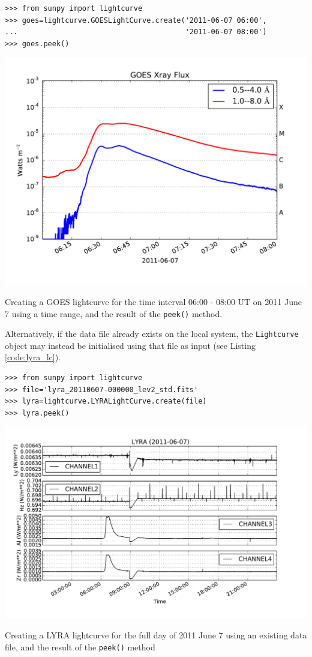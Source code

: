 \begin{listing}[H]
\begin{verbatim}
>>> from sunpy import lightcurve
>>> goes=lightcurve.GOESLightCurve.create('2011-06-07 06:00',
...                                       '2011-06-07 08:00')
>>> goes.peek()
\end{verbatim}
\includegraphics[width=14cm]{goes_lightcurve.pdf}
\caption{Creating a GOES lightcurve for the time interval 06:00 - 08:00 UT on 
2011 June 7 using a time range, and the result of the \texttt{peek()} method.}
\label{code:goes_lc}
\end{listing}

Alternatively, if the data file already exists on the local system, the 
\texttt{Lightcurve} object may instead be initialised using that file as input 
(see Listing \ref{code:lyra_lc}).

\begin{listing}[H]
\begin{verbatim}
>>> from sunpy import lightcurve
>>> file='lyra_20110607-000000_lev2_std.fits'
>>> lyra=lightcurve.LYRALightCurve.create(file)
>>> lyra.peek()
\end{verbatim}
\includegraphics[width=14cm]{lyra_lightcurve.pdf}
\caption{Creating a LYRA lightcurve for the full day of 2011 June 7 using an 
existing data file, and the result of the \texttt{peek()} method}
\label{code:lyra_lc}
\end{listing}

